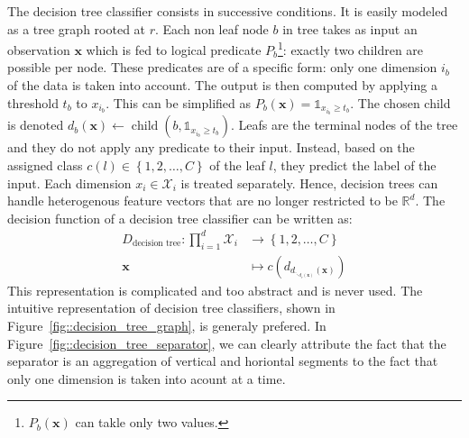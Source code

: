                 The decision tree classifier consists in successive conditions.
                It is easily modeled as a tree graph rooted at $r$.
                Each non leaf node $b$ in tree takes as input an observation $\bm{x}$ which is fed to logical predicate $P_b$\footnote{$P_b(\bm{x})$ can takle only two values.}: exactly two children are possible per node.
                These predicates are of a specific form: only one dimension $i_b$ of the data is taken into account.
                The output is then computed by applying a threshold $t_b$ to $x_{i_b}$.
                This can be simplified as $P_b(\bm{x}) = \mathbb{1}_{x_{i_b} \geq t_b} $.
                The chosen child is denoted $d_b(\bm{x}) \leftarrow \operatorname{child}(b, \mathbb{1}_{x_{i_b} \geq t_b})$.
                Leafs are the terminal nodes of the tree and they do not apply any predicate to their input.
                Instead, based on the assigned class $c(l) \in \left\{1,2,\dots,C\right\}$ of the leaf $l$, they predict the label of the input.
                Each dimension $x_i \in \mathscr{X}_i$ is treated separately.
                Hence, decision trees can handle heterogenous feature vectors that are no longer restricted to be $\mathbb{R}^d$.
                The decision function of a decision tree classifier can be written as:
                \begin{equation}
                    \label{eq::df_decision_tree}
                    \begin{aligned}
                        D_{\text{decision tree}}: \prod_{i=1}^{d}\mathscr{X}_i &\rightarrow \left\{1,2,\dots,C\right\}\\
                        \bm{x} &\mapsto c\left(d_{d_{\ddots_{d_r(\bm{x})}}(\bm{x})}\right)
                    \end{aligned}
                \end{equation}
                This representation is complicated and too abstract and is never used.
                The intuitive representation of decision tree classifiers, shown in Figure~\ref{fig::decision_tree_graph}, is generaly prefered.
                In Figure~\ref{fig::decision_tree_separator}, we can clearly attribute the fact that the separator is an aggregation of vertical and horiontal segments to the fact that only one dimension is taken into acount at a time.\\

